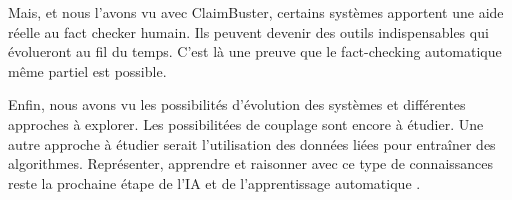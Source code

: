 Mais, et nous l'avons vu avec ClaimBuster, certains systèmes apportent une aide réelle au fact checker humain. Ils peuvent devenir des outils indispensables qui évolueront au fil du temps. C'est là une preuve que le fact-checking automatique même partiel est possible.

Enfin, nous avons vu les possibilités d'évolution des systèmes et différentes approches à explorer. Les possibilitées de couplage sont encore à étudier. Une autre approche à étudier serait l'utilisation des données liées pour entraîner des algorithmes. Représenter, apprendre et raisonner avec ce type de connaissances reste la prochaine étape de l'IA et de l'apprentissage automatique \cite{nickel2016review}.
